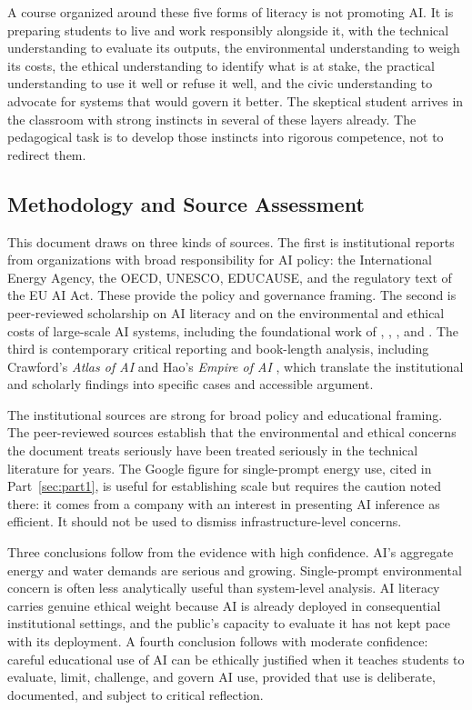 \documentclass[12pt]{article}
\begin{document}
A course organized around these five forms of literacy is not promoting AI. It is preparing students to live and work responsibly alongside it, with the technical understanding to evaluate its outputs, the environmental understanding to weigh its costs, the ethical understanding to identify what is at stake, the practical understanding to use it well or refuse it well, and the civic understanding to advocate for systems that would govern it better. The skeptical student arrives in the classroom with strong instincts in several of these layers already. The pedagogical task is to develop those instincts into rigorous competence, not to redirect them.

\subsection{Methodology and Source Assessment}
\label{sec:II.2}

This document draws on three kinds of sources. The first is institutional reports from organizations with broad responsibility for AI policy: the International Energy Agency, the OECD, UNESCO, EDUCAUSE, and the regulatory text of the EU AI Act. These provide the policy and governance framing. The second is peer-reviewed scholarship on AI literacy and on the environmental and ethical costs of large-scale AI systems, including the foundational work of \textcite{longmagerko2020what}, \textcite{ng2021conceptualizing}, \textcite{strubell2019energy}, and \textcite{bender2021dangers}. The third is contemporary critical reporting and book-length analysis, including Crawford's \emph{Atlas of AI} \autocite{crawford2021atlas} and Hao's \emph{Empire of AI} \autocite{hao2025empire}, which translate the institutional and scholarly findings into specific cases and accessible argument.

The institutional sources are strong for broad policy and educational framing. The peer-reviewed sources establish that the environmental and ethical concerns the document treats seriously have been treated seriously in the technical literature for years. The Google figure for single-prompt energy use, cited in Part~\ref{sec:part1}, is useful for establishing scale but requires the caution noted there: it comes from a company with an interest in presenting AI inference as efficient. It should not be used to dismiss infrastructure-level concerns.

Three conclusions follow from the evidence with high confidence. AI's aggregate energy and water demands are serious and growing. Single-prompt environmental concern is often less analytically useful than system-level analysis. AI literacy carries genuine ethical weight because AI is already deployed in consequential institutional settings, and the public's capacity to evaluate it has not kept pace with its deployment. A fourth conclusion follows with moderate confidence: careful educational use of AI can be ethically justified when it teaches students to evaluate, limit, challenge, and govern AI use, provided that use is deliberate, documented, and subject to critical reflection.
\end{document}
